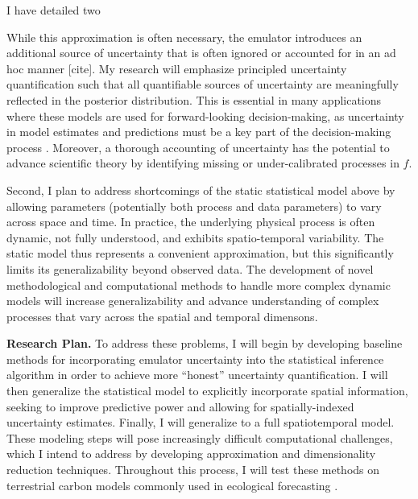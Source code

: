\documentclass[12pt]{article}
\begin{document}
I have detailed two  




 While this approximation is often necessary, the emulator introduces an additional source of uncertainty that is often ignored or accounted for in an ad hoc manner [cite]. My research will emphasize
 principled uncertainty quantification such that all quantifiable sources of uncertainty are meaningfully reflected in the posterior distribution. This is essential in many applications
 where these models are used for forward-looking decision-making, as uncertainty in model estimates and predictions must be a key part of the decision-making process \cite{Dietze}.
 Moreover, a thorough accounting of uncertainty has the potential to advance scientific theory by identifying missing or under-calibrated processes in $f$. 
 
 Second, I plan to address shortcomings of the static statistical model above by allowing parameters (potentially both process and data parameters) to vary across space 
 and time. In practice, the underlying physical process is often dynamic, not fully understood, and exhibits spatio-temporal variability. The static model thus 
 represents a convenient approximation, but this significantly limits its generalizability beyond observed data. The development of novel methodological and computational 
 methods to handle more complex dynamic models will increase generalizability and advance understanding of complex processes that vary across the spatial and 
 temporal dimensons. 

\noindent
\textbf{Research Plan.} To address these problems, I will begin by developing baseline methods for incorporating emulator uncertainty into the statistical inference algorithm in order to achieve more ``honest'' uncertainty quantification. I will then generalize the statistical model to explicitly incorporate spatial information, seeking to improve predictive power and allowing for spatially-indexed uncertainty estimates. Finally, I will generalize to a full spatiotemporal model. These modeling steps will pose increasingly difficult computational challenges, which I intend to address by developing approximation and dimensionality reduction techniques. Throughout this process, I will test these methods on terrestrial carbon models commonly used in ecological forecasting \cite{Dietze}. 
 
\end{document}
